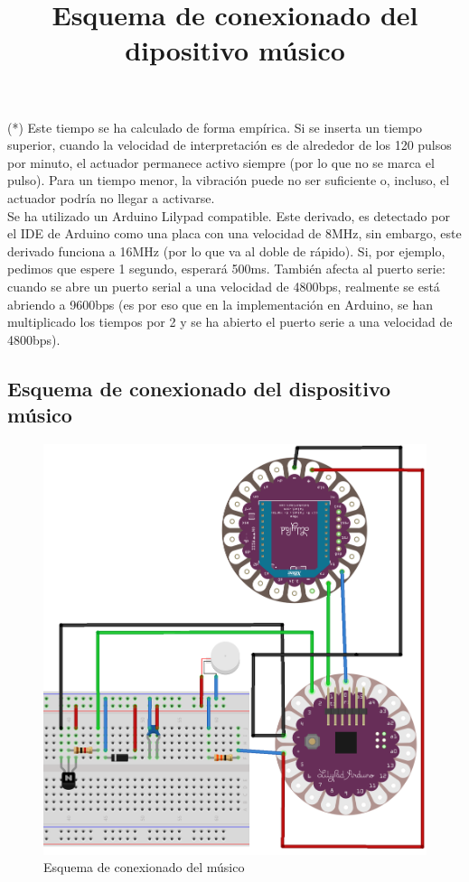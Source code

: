 (*) Este tiempo se ha calculado de forma empírica. Si se inserta un tiempo superior,
cuando la velocidad de interpretación es de alrededor de los 120 pulsos por minuto,
el actuador permanece activo siempre (por lo que no se marca el pulso). Para un tiempo
menor, la vibración puede no ser suficiente o, incluso, el actuador podría no llegar a
activarse.\\

Se ha utilizado un Arduino Lilypad compatible. Este derivado, es detectado por el IDE de Arduino
como una placa con una velocidad de 8MHz, sin embargo,
este derivado funciona a 16MHz (por lo que va al doble de rápido). Si, por ejemplo, pedimos que espere
1 segundo, esperará 500ms. También afecta al puerto serie: cuando se abre un puerto serial a una velocidad
de 4800bps, realmente se está abriendo a 9600bps (es por eso que en la implementación en Arduino, se han multiplicado
los tiempos por 2 y se ha abierto el puerto serie a una velocidad de 4800bps).\\

\subsection{Esquema de conexionado del dispositivo músico}
\title{Esquema de conexionado del dipositivo músico}

\begin{figure}[!htb]
\centering
\includegraphics[width=1\textwidth]{./imagenes/musico_esquema}
\caption{Esquema de conexionado del músico} \label{fig:musico_esquema}
\end{figure}


